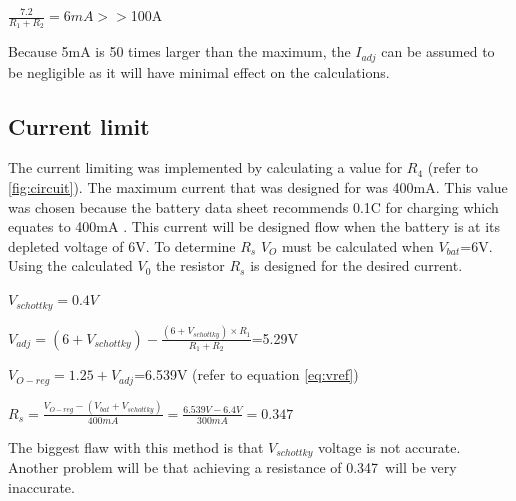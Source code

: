 \begin{center}
    
    $\frac{7.2}{R_1+R_2} = 6mA>>$100\textmu A
\end{center}
Because 5mA is 50 times larger than the maximum, the $I_{adj}$ can be assumed to be negligible as it will have minimal effect on the calculations.

\subsection{Current limit}

The current limiting was implemented by calculating a value for $R_4$ (refer to \ref{fig:circuit}). The maximum current that was designed for was 400mA. This value was chosen because the battery data sheet recommends 0.1C for charging which equates to 400mA \cite{RS}. This current will be designed flow when the battery is at its depleted voltage of 6V. To determine $R_s$ $V_O$ must be calculated when $V_{bat}$=6V. Using the calculated $V_0$ the resistor $R_s$ is designed for the desired current.



\begin{center}
 $V_{schottky}=0.4V$

\end{center}
\begin{center}

    $V_{adj} = (6+V_{schottky})-\frac{(6+V_{schottky})\times R_1}{R_1+R_2}$=5.29V
 
\end{center}
\begin{center}

    $V_{O-reg}= 1.25+V_{adj}$=6.539V (refer to equation \ref{eq:vref})
    
    
\end{center}
\begin{center}
    $R_s=\frac{V_{O-reg}-(V_{bat}+V_{schottky})}{400mA}=\frac{6.539V-6.4V}{300mA}=0.347$\textohm
\end{center}
The biggest flaw with this method is that $V_{schottky}$ voltage is not accurate. Another problem will be that achieving a resistance of 0.347\textohm \ will be very inaccurate.

